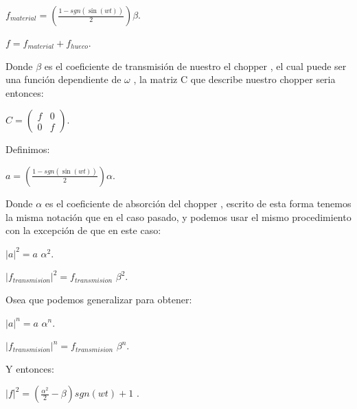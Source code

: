 \documentclass[11pt]{article}
\begin{document}
$f_{material}=\left(\frac{1-sgn(\sin(wt))}{2} \right)\beta$.

$f=f_{material}+f_{hueco}$.

\vspace{0.4cm}

Donde $\beta$
 es el coeficiente de transmisión de nuestro el chopper
, el cual puede ser una función dependiente de $\omega$
, la matriz C que describe nuestro chopper
 seria entonces:
 
\vspace{0.4cm}

$C
=\begin
{pmatrix} f & 0 \\ 0 & f \end
{pmatrix}$.

Definimos:

$a=\left(\frac{1-sgn(\sin(wt))}{2}\right) \alpha$.

Donde $\alpha
 $ es el coeficiente de absorción del chopper
, escrito de esta forma tenemos la misma notación que en el caso pasado, y podemos usar el mismo procedimiento con la excepción de que en este caso:

$|a|^2=a$ $\alpha^2$.

$|f_{transmision}|^2=f_{transmision}$ $\beta^2$.

Osea que podemos generalizar para obtener:

$|a|^n=a$ $\alpha^n$.

$|f_{transmision}|^n=f_{transmision}$ $\beta^n$.

Y entonces:

$|f|^2= \left( \frac{\alpha^2}{2}-\beta \right)sgn(wt) +1$ .

\vspace{0.5cm}
\end{document}

